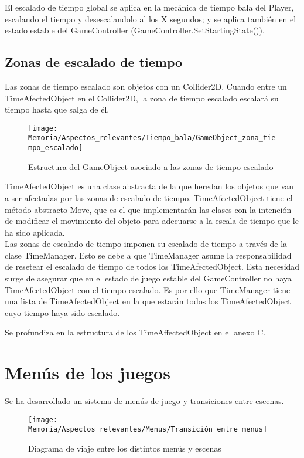 El escalado de tiempo global se aplica en la mecánica de tiempo bala del Player, escalando el tiempo y desescalandolo al los X segundos; y se aplica también en el estado estable del GameController (GameController.SetStartingState()).

\subsection{Zonas de escalado de tiempo}
Las zonas de tiempo escalado son objetos con un Collider2D. Cuando entre un TimeAfectedObject en el Collider2D, la zona de tiempo escalado escalará su tiempo hasta que salga de él.

\begin{figure}[h]
\texttt{[image: Memoria/Aspectos\_relevantes/Tiempo\_bala/GameObject\_zona\_tiempo\_escalado]}
\caption{Estructura del GameObject asociado a las zonas de tiempo escalado}
\end{figure}

TimeAfectedObject es una clase abstracta de la que heredan los objetos que van a ser afectadas por las zonas de escalado de tiempo. TimeAfectedObject tiene el método abstracto Move, que es el que implementarán las clases con la intención de modificar el movimiento del objeto para adecuarse a la escala de tiempo que le ha sido aplicada.\\
Las zonas de escalado de tiempo imponen su escalado de tiempo a través de la clase TimeManager. Esto se debe a que TimeManager asume la responsabilidad de resetear el escalado de tiempo de todos los TimeAfectedObject. Esta necesidad surge de asegurar que en el estado de juego estable del GameController no haya TimeAfectedObject con el tiempo escalado. Es por ello que TimeManager tiene una lista de TimeAfectedObject en la que estarán todos los TimeAfectedObject cuyo tiempo haya sido escalado.

Se profundiza en la estructura de los TimeAffectedObject en el anexo C.

\section{Menús de los juegos}
Se ha desarrollado un sistema de menús de juego y transiciones entre escenas.

\begin{figure}[h]
\texttt{[image: Memoria/Aspectos\_relevantes/Menus/Transición\_entre\_menus]}
\caption{Diagrama de viaje entre los distintos menús y escenas}
\end{figure}


